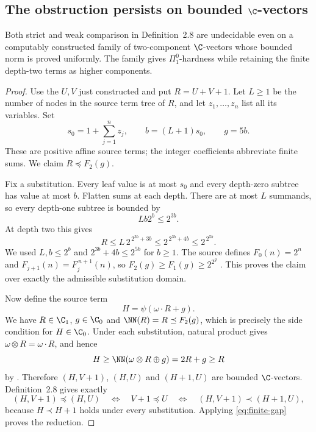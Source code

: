 \documentclass[11pt]{article}
\begin{document}
\subsection{\texorpdfstring{The obstruction persists on bounded $\C$-vectors}{The obstruction persists on bounded C-vectors}}

\begin{theorem}
\label{thm:bounded-bare-vectors}
Both strict and weak comparison in Definition~2.8 are undecidable even
on a computably constructed family of two-component $\C$-vectors whose
bounded norm is proved uniformly. The family gives $\Pi^0_1$-hardness
while retaining the finite depth-two terms as higher components.
\end{theorem}

\begin{proof}
Use the $U,V$ just constructed and put $R=U+V+1$. Let $L\ge1$ be
the number of nodes in the source term tree of $R$, and let
$z_1,\ldots,z_n$ list all its variables. Set
\[
 s_0=1+\sum_{j=1}^{n}z_j,
 \qquad b=(L+1)s_0,
 \qquad g=5b.
\]
These are positive affine source terms; the integer coefficients
abbreviate finite sums. We claim $R\preceq F_2(g)$.

Fix a substitution. Every leaf value is at most $s_0$ and every
depth-zero subtree has value at most $b$. Flatten sums at each depth.
There are at most $L$ summands, so every depth-one subtree is bounded by
\[
 Lb2^b\le2^{3b}.
\]
At depth two this gives
\[
 R\le L\,2^{\,2^{3b}+3b}
   \le2^{\,2^{3b}+4b}
   \le2^{\,2^{5b}}.
\]
We used $L,b\le2^b$ and $2^{3b}+4b\le2^{5b}$ for $b\ge1$.
The source defines $F_0(n)=2^n$ and
$F_{j+1}(n)=F_j^{\,n+1}(n)$, so
$F_2(g)\ge F_1(g)\ge2^{2^g}$ \cite[p.~15]{WW}.
This proves the claim over exactly the admissible substitution domain.

Now define the source term
\[
 H=\psi(\omega\mathbin{\cdot}R+g).
\]
We have $R\in\C_1$, $g\in\C_0$ and
$\NN(R)=R\preceq F_2(g)$, which is precisely the side condition
for $H\in\C_0$. Under each substitution, natural product gives
$\omega\otimes R=\omega\cdot R$, and hence
\[
 H\ge\NN(\omega\otimes R\oplus g)=2R+g\ge R
\]
by \cite[Proposition~2.3]{WW}. Therefore
$(H,V+1)$, $(H,U)$ and $(H+1,U)$ are bounded $\C$-vectors.
Definition~2.8 gives exactly
\[
 (H,V+1)\preceq(H,U)
 \quad\Longleftrightarrow\quad V+1\preceq U
 \quad\Longleftrightarrow\quad
 (H,V+1)\prec(H+1,U),
\]
because $H\prec H+1$ holds under every substitution. Applying
\eqref{eq:finite-gap} proves the reduction.
\end{proof}
\end{document}
